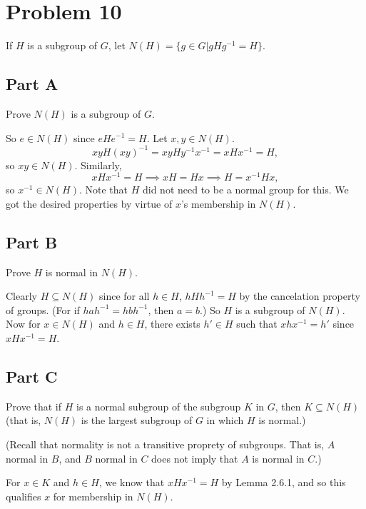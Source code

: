 \documentclass[12pt]{article}
\begin{document}
\section*{Problem 10}

If $H$ is a subgroup of $G$, let $N(H)=\{g\in G|gHg^{-1}=H\}.$

\subsection*{Part A}

Prove $N(H)$ is a subgroup of $G$.

So $e\in N(H)$ since $eHe^{-1}=H$.  Let $x,y\in N(H)$.
\begin{equation*}
xyH(xy)^{-1}=xyHy^{-1}x^{-1} = xHx^{-1}=H,
\end{equation*}
so $xy\in N(H)$.  Similarly,
\begin{equation*}
xHx^{-1} = H\implies xH=Hx\implies H=x^{-1}Hx,
\end{equation*}
so $x^{-1}\in N(H)$.  Note that $H$ did not need to be a normal group for this.
We got the desired properties by virtue of $x$'s membership in $N(H)$.

\subsection*{Part B}

Prove $H$ is normal in $N(H)$.

Clearly $H\subseteq N(H)$ since for all $h\in H$, $hHh^{-1}=H$ by the cancelation property of groups.
(For if $hah^{-1}=hbh^{-1}$, then $a=b$.)
So $H$ is a subgroup of $N(H)$.  Now for $x\in N(H)$ and $h\in H$,
there exists $h'\in H$ such that $xhx^{-1}=h'$ since $xHx^{-1}=H$.

\subsection*{Part C}

Prove that if $H$ is a normal subgroup of the subgroup $K$ in $G$, then $K\subseteq N(H)$
(that is, $N(H)$ is the largest subgroup of $G$ in which $H$ is normal.)

(Recall that normality is not a transitive proprety of subgroups.  That is, $A$ normal in $B$, and $B$
normal in $C$ does not imply that $A$ is normal in $C$.)

For $x\in K$ and $h\in H$, we know that $xHx^{-1}=H$ by Lemma 2.6.1,
and so this qualifies $x$ for membership in $N(H)$.
\end{document}
